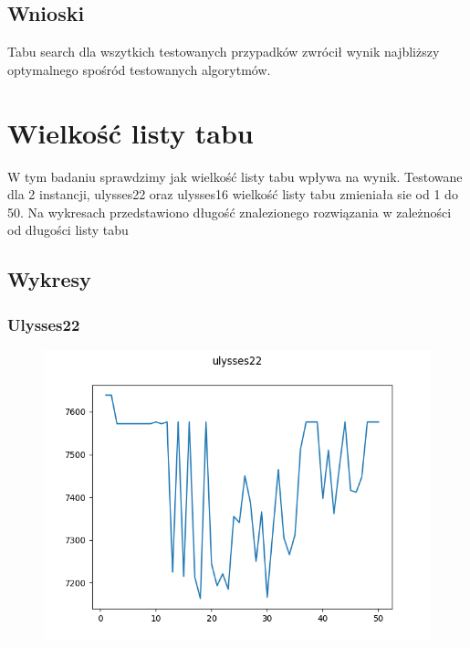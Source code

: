 \documentclass[11pt]{article}
\begin{document}
    \subsection{Wnioski}
        Tabu search dla wszytkich testowanych przypadków zwrócił wynik najbliższy optymalnego 
        spośród testowanych algorytmów.

\section{Wielkość listy tabu}
        W tym badaniu sprawdzimy jak wielkość listy tabu wpływa na wynik.
        Testowane dla 2 instancji, ulysses22 oraz ulysses16 wielkość listy tabu zmieniała sie od
        1 do 50. Na wykresach przedstawiono długość znalezionego rozwiązania w zależności od 
        długości listy tabu

        \subsection{Wykresy}
            \subsubsection{Ulysses22}
                \begin{center}
                \begin{figure}[H]

                    \includegraphics[scale=0.6]{tabuListUlysses22.png}

                \end{figure}
                \end{center}
\end{document}
